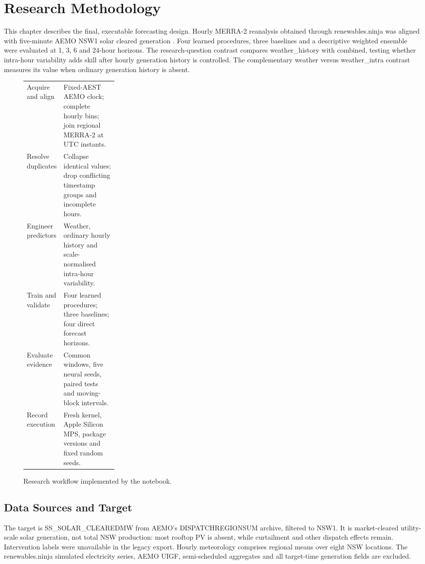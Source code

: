 \section{Research Methodology}

This chapter describes the final, executable forecasting design. Hourly MERRA-2 reanalysis obtained through renewables.ninja \cite{pfenninger2016longterm,renewables2025api} was aligned with five-minute AEMO NSW1 solar cleared generation \cite{aemo2024nemosis}. Four learned procedures, three baselines and a descriptive weighted ensemble were evaluated at 1, 3, 6 and 24-hour horizons. The research-question contrast compares weather\_\allowbreak{}history with combined, testing whether intra-hour variability adds skill after hourly generation history is controlled. The complementary weather versus weather\_\allowbreak{}intra contrast measures its value when ordinary generation history is absent.

\begin{figure}[!htbp]\centering\small
\begin{tabularx}{\linewidth}{|p{0.24\linewidth}|X|}\hline
Acquire and align & Fixed-AEST AEMO clock; complete hourly bins; join regional MERRA-2 at UTC instants. \\
Resolve duplicates & Collapse identical values; drop conflicting timestamp groups and incomplete hours. \\
Engineer predictors & Weather, ordinary hourly history and scale-normalised intra-hour variability. \\
Train and validate & Four learned procedures; three baselines; four direct forecast horizons. \\
Evaluate evidence & Common windows, five neural seeds, paired tests and moving-block intervals. \\
Record execution & Fresh kernel, Apple Silicon MPS, package versions and fixed random seeds. \\
\hline\end{tabularx}
\caption{Research workflow implemented by the notebook.}\label{fig:ch3_1}\end{figure}

\subsection{Data Sources and Target}

The target is SS\_\allowbreak{}SOLAR\_\allowbreak{}CLEAREDMW from AEMO's DISPATCHREGIONSUM archive, filtered to NSW1. It is market-cleared utility-scale solar generation, not total NSW production: most rooftop PV is absent, while curtailment and other dispatch effects remain. Intervention labels were unavailable in the legacy export. Hourly meteorology comprises regional means over eight NSW locations. The renewables.ninja simulated electricity series, AEMO UIGF, semi-scheduled aggregates and all target-time generation fields are excluded.

